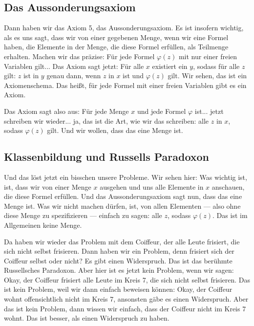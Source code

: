 \subsection{Das Aussonderungsaxiom}
\begin{spoken-clean}[00:25:03 - 00:28:41]
Dann haben wir das Axiom 5, das Aussonderungsaxiom. Es ist insofern wichtig, als es uns sagt, dass wir von einer gegebenen Menge, wenn wir eine Formel haben, die Elemente in der Menge, die diese Formel erfüllen, als Teilmenge erhalten. Machen wir das präzise: Für jede Formel $\varphi(z)$ mit nur einer freien Variablen gilt... Das Axiom sagt jetzt: Für alle $x$ existiert ein $y$, sodass für alle $z$ gilt: $z$ ist in $y$ genau dann, wenn $z$ in $x$ ist und $\varphi(z)$ gilt. Wir sehen, das ist ein Axiomenschema. Das heißt, für jede Formel mit einer freien Variablen gibt es ein Axiom.

Das Axiom sagt also aus: Für jede Menge $x$ und jede Formel $\varphi$ ist... jetzt schreiben wir wieder... ja, das ist die Art, wie wir das schreiben: alle $z$ in $x$, sodass $\varphi(z)$ gilt. Und wir wollen, dass das eine Menge ist.
\end{spoken-clean}

\subsection{Klassenbildung und Russells Paradoxon}
\begin{spoken-clean}[00:28:41 - 00:30:51]
Und das löst jetzt ein bisschen unsere Probleme. Wir sehen hier: Was wichtig ist, ist, dass wir von einer Menge $x$ ausgehen und uns alle Elemente in $x$ anschauen, die diese Formel erfüllen. Und das Aussonderungsaxiom sagt nun, dass das eine Menge ist. Was wir nicht machen dürfen, ist, von allen Elementen --- also ohne diese Menge zu spezifizieren --- einfach zu sagen: alle $z$, sodass $\varphi(z)$. Das ist im Allgemeinen keine Menge.

Da haben wir wieder das Problem mit dem Coiffeur, der alle Leute frisiert, die sich nicht selbst frisieren. Dann haben wir ein Problem, denn frisiert sich der Coiffeur selbst oder nicht? Es gibt einen Widerspruch. Das ist das berühmte Russellsches Paradoxon. Aber hier ist es jetzt kein Problem, wenn wir sagen: Okay, der Coiffeur frisiert alle Leute im Kreis 7, die sich nicht selbst frisieren. Das ist kein Problem, weil wir dann einfach beweisen können: Okay, der Coiffeur wohnt offensichtlich nicht im Kreis 7, ansonsten gäbe es einen Widerspruch. Aber das ist kein Problem, dann wissen wir einfach, dass der Coiffeur nicht im Kreis 7 wohnt. Das ist besser, als einen Widerspruch zu haben.
\end{spoken-clean}

